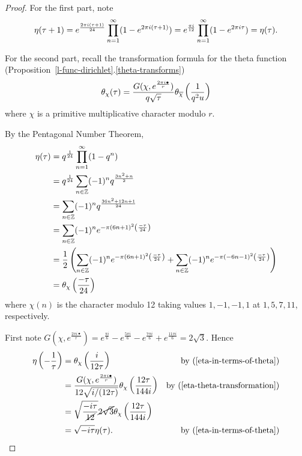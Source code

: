 \begin{proof}
For the first part, note
\[
\eta(\tau+1)=e^{\frac{2\pi i (\tau+1)}{24}}\prod_{n=1}^{\infty}(1-e^{2\pi i (\tau+1)})=e^{\frac{\pi i}{12}}\prod_{n=1}^{\infty}(1-e^{2\pi i \tau})=\eta(\tau).
\]

For the second part, recall the transformation formula for the theta function (Proposition~\ref{l-func-dirichlet}.\ref{theta-transforms})
\begin{equation}\label{eta-theta-transformation}
\theta_{\chi}(\tau)=\frac{G(\chi,e^{\frac{2\pi i \bullet}{r}})}{q\sqrt{\tau}} \theta_{\overline{\chi}}\left( {\frac{1}{q^2u}} \right)
\end{equation}
where $\chi$ is a primitive multiplicative character modulo $r$.

By the Pentagonal Number Theorem,
\begin{align}
\nonumber
\eta(\tau)&=q^{\frac{1}{24}} \prod_{n=1}^{\infty} (1-q^n)\\
\nonumber
&=q^{\frac{1}{24}} \sum_{n\in \mathbb{Z}} (-1)^n q^{\frac{3n^2+n}{2}}\\
\nonumber
&=\sum_{n\in \mathbb{Z}} (-1)^n q^{\frac{36n^2+12n+1}{24}}\\
\nonumber
&=\sum_{n\in \mathbb{Z}} (-1)^n e^{-\pi(6n+1)^2 \left( {\frac{-\tau}{24}} \right)}\\
\nonumber
&=\frac{1}{2}\left( {\sum_{n\in \mathbb{Z}} (-1)^n e^{-\pi(6n+1)^2 \left( {\frac{-\tau}{24}} \right)}+\sum_{n\in \mathbb{Z}} (-1)^n e^{-\pi(-6n-1)^2 \left( {\frac{-\tau}{24}} \right)}} \right)\\
\label{eta-in-terms-of-theta}
&=\theta_{\chi}\left( {\frac{-\tau}{24}} \right)
\end{align}
where $\chi(n)$ is the character modulo 12 taking values $1,-1,-1,1$ at $1, 5, 7, 11$, respectively.

First note $G(\chi,e^{\frac{2\pi i \bullet}{r}})=e^{\frac{\pi i}{6}}-e^{\frac{5\pi i}{6}}-e^{\frac{7\pi i}{6}}+e^{\frac{11\pi i}{6}}=2\sqrt 3$. Hence
\begin{align*}
\eta\pa{-\rc{\tau}} &=\te_{\chi}\pf{i}{12\tau}&\by{eta-in-terms-of-theta}\\
&=\frac{G(\chi,e^{\frac{2\pi i \bullet}{r}})}{12\sqrt{i/(12\tau)}}\te_{\chi}\pf{12\tau}{144i}&\by{eta-theta-transformation}\\
&=\sqrt{\frac{-i\tau}{\cancel{12}}}\cancel{2\sqrt 3}\te_{\chi}\pf{12\tau}{144i}\\
&=\sqrt{-i\tau}\eta(\tau).&\by{eta-in-terms-of-theta}
\end{align*}
\end{proof}
%
